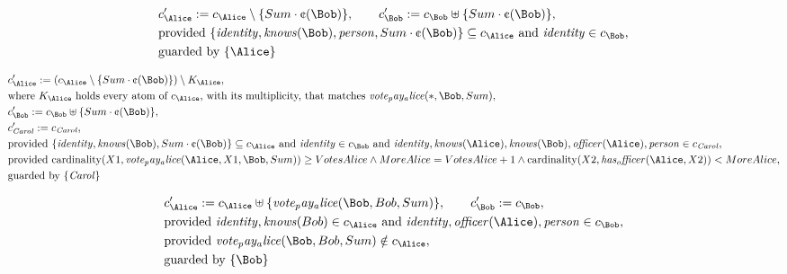 \begin{align*}
&
c'_
{
\Alice
}
 := 
c_
{
\Alice
}
 \setminus 
\{
Sum
\cdot
\text{\textcent}
(
\Bob
)
\}
, \qquad 
c'_
{
\Bob
}
 := 
c_
{
\Bob
}
 \uplus 
\{
Sum
\cdot
\text{\textcent}
(
\Bob
)
\}
,\\
&
\text{provided } 
\{
\mathit{
identity
}
,
\mathit{
knows
}
(
\Bob
)
,
\mathit{
person
}
,
Sum
\cdot
\text{\textcent}
(
\Bob
)
\}
 \subseteq c_
{
\Alice
}
 \text{ and } 
\mathit{
identity
}
 \in c_
{
\Bob
}
,\\
&
\text{guarded by } \{
\Alice
\}
\end{align*}

\begin{align*}
&
c'_
{
\Alice
}
 := 
(c_
{
\Alice
}
 \setminus 
\{
Sum
\cdot
\text{\textcent}
(
\Bob
)
\}
) \setminus K_
{
\Alice
}
,\\
&
\text{where } K_
{
\Alice
}
 \text{ holds every atom of } c_
{
\Alice
}
 \text{, with its multiplicity, that matches } 
\mathit{
vote_pay_alice
}
(
\ast
,
\Bob
,
Sum
)
,\\
&
c'_
{
\Bob
}
 := 
c_
{
\Bob
}
 \uplus 
\{
Sum
\cdot
\text{\textcent}
(
\Bob
)
\}
,\\
&
c'_
{
\mathit{Carol}
}
 := 
c_
{
\mathit{Carol}
}
,\\
&
\text{provided } 
\{
\mathit{
identity
}
,
\mathit{
knows
}
(
\Bob
)
,
Sum
\cdot
\text{\textcent}
(
\Bob
)
\}
 \subseteq c_
{
\Alice
}
 \text{ and } 
\mathit{
identity
}
 \in c_
{
\Bob
}
 \text{ and } 
\mathit{
identity
}
,
\mathit{
knows
}
(
\Alice
)
,
\mathit{
knows
}
(
\Bob
)
,
\mathit{
officer
}
(
\Alice
)
,
\mathit{
person
}
 \in c_
{
\mathit{Carol}
}
,\\
&
\text{provided } 
\mathrm{cardinality}(
X1
,
\mathit{
vote_pay_alice
}
(
\Alice
,
X1
,
\Bob
,
Sum
)
)
\ge
VotesAlice
\land
MoreAlice
=
VotesAlice
+
1
\land
\mathrm{cardinality}(
X2
,
\mathit{
has_officer
}
(
\Alice
,
X2
)
)
<
MoreAlice
,\\
&
\text{guarded by } \{
\mathit{Carol}
\}
\end{align*}

\begin{align*}
&
c'_
{
\Alice
}
 := 
c_
{
\Alice
}
 \uplus 
\{
\mathit{
vote_pay_alice
}
(
\Bob
,
Bob
,
Sum
)
\}
, \qquad 
c'_
{
\Bob
}
 := 
c_
{
\Bob
}
,\\
&
\text{provided } 
\mathit{
identity
}
,
\mathit{
knows
}
(
Bob
)
 \in c_
{
\Alice
}
 \text{ and } 
\mathit{
identity
}
,
\mathit{
officer
}
(
\Alice
)
,
\mathit{
person
}
 \in c_
{
\Bob
}
,\\
&
\text{provided } 
\mathit{
vote_pay_alice
}
(
\Bob
,
Bob
,
Sum
)
 \notin c_
{
\Alice
}
,\\
&
\text{guarded by } \{
\Bob
\}
\end{align*}
